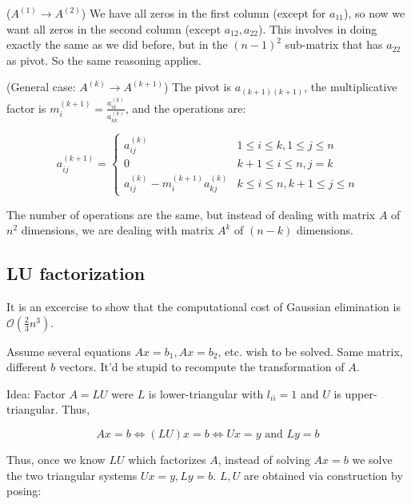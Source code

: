 \documentclass[12pt]{article}
\theoremstyle{definition}
\begin{document}
($A^{(1)} \to A^{(2)}$) We have all zeros in the first column (except for
$a_{11}$), so now we want all zeros in the second column (except $a_{12},
a_{22}$). This involves in doing exactly the same as we did before,
but in the $(n-1)^2$ sub-matrix that has $a_{22}$ as pivot. So the same
reasoning applies. 

(General case: $A^{(k)} \to A^{(k+1)}$) The pivot is $a_{(k+1)(k+1)}$, the
multiplicative factor is $m_i^{(k+1)} = \frac{a^{(k)}_{ik}}{a^{(k)}_{kk}}$, 
and the operations are: 

\begin{equation*}
    a^{(k+1)}_{ij} = \begin{cases}
        a^{(k)}_{ij} & 1 \leq i \leq k, 1 \leq j \leq n \\ 
        0 & k+1 \leq i \leq n, j = k \\ 
        a^{(k)}_{ij} - m_i^{(k+1)} a^{(k)}_{kj} & k \leq i \leq n, k+1 \leq j
        \leq n
    \end{cases}
\end{equation*}

The number of operations are the same, but instead of dealing with matrix $A$ of
$n^2$ dimensions, we are dealing with matrix $A^k$ of $(n-k)$ dimensions. 


\subsection{LU factorization}

It is an excercise to show that the computational cost of Gaussian elimination
is $\mathcal{O}\left( \frac{2}{3}n^3 \right) $. 

Assume several equations $Ax = b_1, Ax = b_2$, etc. wish to be solved. Same
matrix, different $b$ vectors. It'd be stupid to recompute the transformation of
$A$.

Idea: Factor $A = LU$ were $L$ is lower-triangular with $l_{ii} = 1$ and $U$ is
upper-triangular. Thus, 

\begin{equation*}
    Ax = b \iff (LU)x = b \iff Ux = y \text{ and } Ly = b
\end{equation*}

Thus, once we know $LU$ which factorizes $A$, instead of solving $Ax = b$ we
solve the two triangular systems $Ux = y, Ly = b$. $L, U$ are obtained via
construction by posing:
\end{document}
